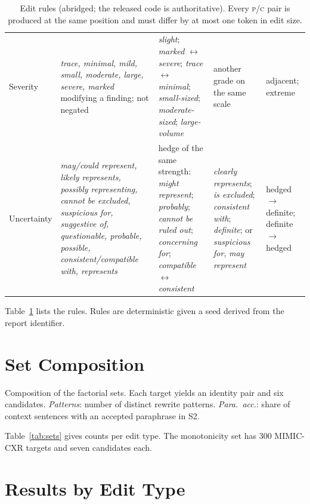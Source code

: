 \documentclass[11pt]{article}
\newcommand{\Pc}{\textsc{p}\xspace}
\newcommand{\Cc}{\textsc{c}\xspace}
\begin{document}
\begin{table}[t]
\begin{tabular}{p{}p{}p{}p{}p{}}
Severity & \emph{trace, minimal, mild, small, moderate, large, severe, marked} modifying a finding; not negated & \emph{slight}; \emph{marked} $\leftrightarrow$ \emph{severe}; \emph{trace} $\leftrightarrow$ \emph{minimal}; \emph{small-sized}; \emph{moderate-sized}; \emph{large-volume} & another grade on the same scale & adjacent; extreme \\
Uncertainty & \emph{may/could represent, likely represents, possibly representing, cannot be excluded, suspicious for, suggestive of, questionable, probable, possible, consistent/compatible with, represents} & hedge of the same strength: \emph{might represent}; \emph{probably}; \emph{cannot be ruled out}; \emph{concerning for}; \emph{compatible} $\leftrightarrow$ \emph{consistent} & \emph{clearly represents}; \emph{is excluded}; \emph{consistent with}; \emph{definite}; or \emph{suspicious for}, \emph{may represent} & hedged$\to$definite; definite$\to$hedged \\
\bottomrule
\end{tabular}
\caption{Edit rules (abridged; the released code is authoritative). Every \Pc/\Cc pair is produced at the same position and must differ by at most one token in edit size.}
\label{tab:rules}
\end{table}

Table~\ref{tab:rules} lists the rules. Rules are deterministic given a seed derived from the report identifier.

\section{Set Composition}
\label{app:sets}

\begin{table}[t]
\centering
\small
\begin{adjustbox}{max width=\textwidth}

\end{adjustbox}
\caption{Composition of the factorial sets. Each target yields an identity pair and six candidates. \emph{Patterns}: number of distinct rewrite patterns. \emph{Para.\ acc.}: share of context sentences with an accepted paraphrase in S2.}
\label{tab:sets}
\end{table}

Table~\ref{tab:sets} gives counts per edit type. The monotonicity set has 300 MIMIC-CXR targets and seven candidates each.

\section{Results by Edit Type}
\label{app:types}
\end{document}
